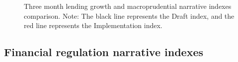 \documentclass[
  letterpaper,
  DIV=11,
  numbers=noendperiod]{scrartcl}
\begin{document}
\newpage

\begin{figure}[H]


\caption{\label{fig-macro_narrative_indexes_three_month}Three month
lending growth and macroprudential narrative indexes comparison. Note:
The black line represents the Draft index, and the red line represents
the Implementation index.}

\end{figure}%

\newpage

\subsection{Financial regulation narrative
indexes}\label{financial-regulation-narrative-indexes}
\end{document}
